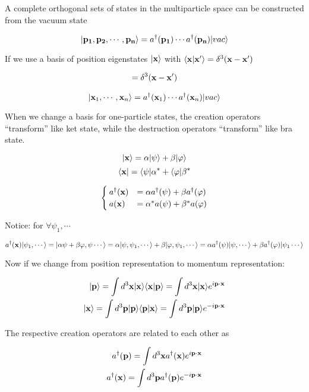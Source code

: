 ﻿\documentclass[twoside]{book}
\numberwithin{equation}{section}
\begin{document}
A complete orthogonal sets of states in the multiparticle space can be constructed from the vacuum state 

\[|{\bf p_1},{\bf p_2},\cdots,{\bf p_n}\rangle = a^\dagger({\bf p_1})\cdots a^\dagger({\bf p_n})|vac\rangle \]

If we use a basis of position eigenstates $|\bf{x}\rangle$ with $\langle {\bf x}|{\bf x'}\rangle = \delta^3({\bf x} - {\bf x'})$

\begin{align}
[a({\bf x}),a^\dagger({\bf x'})] = \delta^3({\bf x} - {\bf x'})
\end{align}

\[|{\bf x}_1,\cdots,{\bf x}_n\rangle = a^\dagger({\bf x}_1)\cdots a^\dagger({\bf x}_n)|vac\rangle \]

When we change a basis for one-particle states, the creation operators ``transform'' like ket state, while the destruction operators ``transform'' like bra state. 

\[|{\bf x}\rangle = \alpha|\psi\rangle + \beta|\varphi\rangle \]
\[\langle{\bf x}| = \langle\psi|\alpha^* + \langle\varphi|\beta^* \]

\[\begin{cases}
a^\dagger({\bf x}) &= \alpha a^\dagger(\psi)+\beta a^\dagger(\varphi)\\
a({\bf x}) &= \alpha^* a(\psi) + \beta^* a(\varphi)
\end{cases}\]

Notice: for $\forall \psi_1,\cdots$

\[a^\dagger({\bf x})|\psi_1,\cdots\rangle = |\alpha\psi+\beta\varphi,\psi\cdots\rangle = \alpha|\psi,\psi_1,\cdots\rangle + \beta|\varphi,\psi_1,\cdots\rangle = \alpha a^\dagger(\psi)|\psi,\cdots\rangle + \beta a^\dagger(\varphi)|\psi_1\cdots\rangle \]

Now if we change from position representation to momentum representation:

\[\begin{split}
|{\bf p}\rangle = \int d^3{\bf x} |{\bf x}\rangle\langle{\bf x}|{\bf p}\rangle = \int d^3{\bf x}|{\bf x}\rangle e^{i{\bf p}\cdot{\bf x}}\\
|{\bf x}\rangle = \int d^3{\bf p} |{\bf p}\rangle\langle{\bf p}|{\bf x}\rangle = \int d^3{\bf p}|{\bf p}\rangle e^{-i{\bf p}\cdot{\bf x}}
\end{split}\]

The respective creation operators are related to each other as 

\begin{align}
\begin{split}
a^\dagger({\bf p}) = \int d^3{\bf x} a^\dagger({\bf x}) e^{i{\bf p}\cdot{\bf x}}\\
a^\dagger({\bf x}) = \int d^3{\bf p} a^\dagger({\bf p}) e^{-i{\bf p}\cdot{\bf x}}
\end{split}
\end{align}
\end{document}
